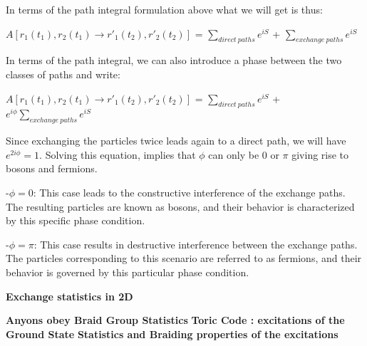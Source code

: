 \documentclass[12pt]{report}
\begin{document}
\begin{minipage}{1 \textwidth}
		In terms of the path integral formulation above what we will get is thus:
		
		\begin{center}
			$A[r_1(t_1),r_2(t_1) \rightarrow r'_1(t_2),r'_2(t_2)]$ = $\sum_{direct \ paths} e^{iS}$ + $\sum_{exchange \ paths} e^{iS}$
		\end{center}
		
		In terms of the path integral, we can also introduce a phase
		between the two classes of paths and write: 
		
		\begin{center}
			$A[r_1(t_1),r_2(t_1) \rightarrow r'_1(t_2),r'_2(t_2)]$ = $\sum_{direct \ paths} e^{iS}$ + $e^{i \phi} \sum_{exchange \ paths} e^{iS}$
		\end{center}
		
		Since exchanging the particles twice leads again to a direct path, we will have $e^{2i \phi} = 1$. Solving this equation, implies that $\phi$ can only be 0 or $\pi$ giving rise to bosons and fermions. \newline	
		
		-$\phi = 0$: This case leads to the constructive interference of the exchange paths. The resulting particles are known as bosons, and their behavior is characterized by this specific phase condition.\newline
		
		-$\phi = \pi$: This case results in destructive interference between the exchange paths. The particles corresponding to this scenario are referred to as fermions, and their behavior is governed by this particular phase condition.\newline
		
	\end{minipage}
	
	\begin{minipage}{1 \textwidth}
		\textbf{Exchange statistics in 2D }\newline
		
	\end{minipage}
	
	\begin{minipage}{1 \textwidth}
		
		
		
	\end{minipage}
	
	\begin{minipage}{1 \textwidth}
		\textbf{Anyons obey Braid Group Statistics}\newline
		\textbf{Toric Code : excitations of the Ground State }\newline
		\textbf{Statistics and Braiding properties of the excitations}\newline
		
	\end{minipage}
	
\end{document}
